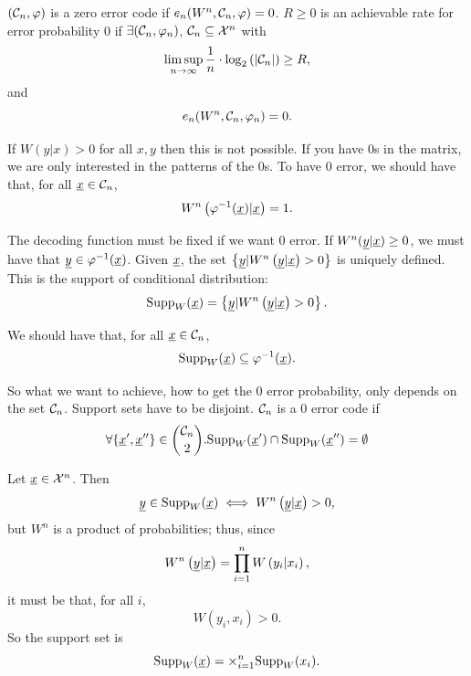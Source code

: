 $(\mathcal{C}_n, \varphi)$ is a zero error code if $e_n(W^n, \mathcal{C}_n, \varphi) = 0$.
$R \geq 0$ is an achievable rate for error probability $0$ if $\exists (\mathcal{C}_n, \varphi_n)$, $\mathcal{C}_n \subseteq \mathcal{X}^n$ with
\begin{equation*}
	\limsup_{n \to \infty} \frac{1}{n} \cdot \log_2 \left( {\left|{\mathcal{C}_n}\right|} \right) \ge R,
\end{equation*}
and
\begin{equation*}
	e_n(W^n, \mathcal{C}_n, \varphi_n) = 0.
\end{equation*}

If $W(y|x) > 0$ for all $x, y$ then this is not possible.
If you have 0s in the matrix, we are only interested in the patterns of the 0s.
To have 0 error, we should have that, for all $\underline{x} \in \mathcal{C}_n$,
\begin{equation*}
	W^n \left( \varphi^{-1}(\underline{x}) | \underline{x} \right) = 1.
\end{equation*}

The decoding function must be fixed if we want $0$ error.
If $W^n(\underline{y} | \underline{x}) \ge 0$, we must have that $\underline{y} \in \varphi^{-1}(\underline{x})$.
Given $\underline{x}$, the set $\left\{ \underline{y} | W^n \left( \underline{y} | \underline{x} \right) > 0 \right\}$ is uniquely defined.
This is the support of conditional distribution:
\begin{equation*}
	\mathrm{Supp}_W(\underline{x}) = \left\{ \underline{y} |  W^n \left( \underline{y} | \underline{x} \right) > 0 \right\}.
\end{equation*}

We should have that, for all $\underline{x} \in \mathcal{C}_n$,
\begin{equation*}
	\mathrm{Supp}_W(\underline{x}) \subseteq \varphi^{-1}(\underline{x}).
\end{equation*}

So what we want to achieve, \ie how to get the 0 error probability, only depends on the set $\mathcal{C}_n$.
Support sets have to be disjoint.
$\mathcal{C}_n$ is a $0$ error code if
\begin{equation*}
	\forall \{ \underline{x}',\underline{x}'' \} \in \binom{\mathcal{C}_n}{2} .
	\mathrm{Supp}_W(\underline{x}') \cap \mathrm{Supp}_W(\underline{x}'') = \emptyset
\end{equation*}

\begin{obs}
	Let $\underline{x} \in \mathcal{X}^n$.
	Then
	\begin{equation*}
		\underline{y} \in \mathrm{Supp}_W(\underline{x}) \iff W^n \left( \underline{y} | \underline{x} \right) >0,
	\end{equation*}
	but $W^n$ is a product of probabilities; thus, since
	\begin{equation*}
		W^n \left( \underline{y} | \underline{x} \right) = \prod_{i=1}^{n} W \left( y_i | x_i \right),
	\end{equation*}
	it must be that, for all $i$,
	\begin{equation*}
		W(y_i, x_i) > 0.
	\end{equation*}
	So the support set is
	\begin{equation*}
		\mathrm{Supp}_W(\underline{x}) = \times_{i=1}^{n} \mathrm{Supp}_W(x_i).
	\end{equation*}
\end{obs}

